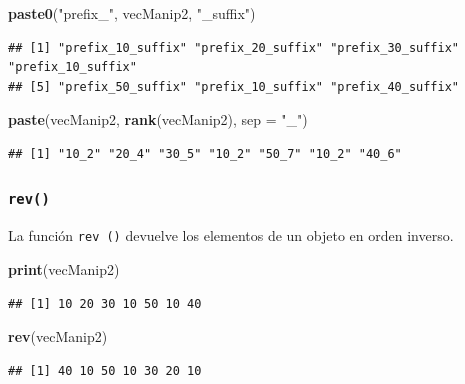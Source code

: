 \documentclass[
]{book}
\newenvironment{Shaded}{\begin{snugshade}}{\end{snugshade}}
\newcommand{\DataTypeTok}[1]{\textcolor[rgb]{0.13,0.29,0.53}{#1}}
\newcommand{\KeywordTok}[1]{\textcolor[rgb]{0.13,0.29,0.53}{\textbf{#1}}}
\newcommand{\NormalTok}[1]{#1}
\newcommand{\StringTok}[1]{\textcolor[rgb]{0.31,0.60,0.02}{#1}}
\begin{document}
\begin{Shaded}
\begin{Highlighting}[]
\KeywordTok{paste0}\NormalTok{(}\StringTok{"prefix_"}\NormalTok{, vecManip2, }\StringTok{"_suffix"}\NormalTok{)}
\end{Highlighting}
\end{Shaded}

\begin{verbatim}
## [1] "prefix_10_suffix" "prefix_20_suffix" "prefix_30_suffix" "prefix_10_suffix"
## [5] "prefix_50_suffix" "prefix_10_suffix" "prefix_40_suffix"
\end{verbatim}

\begin{Shaded}
\begin{Highlighting}[]
\KeywordTok{paste}\NormalTok{(vecManip2, }\KeywordTok{rank}\NormalTok{(vecManip2), }\DataTypeTok{sep =} \StringTok{"_"}\NormalTok{)}
\end{Highlighting}
\end{Shaded}

\begin{verbatim}
## [1] "10_2" "20_4" "30_5" "10_2" "50_7" "10_2" "40_6"
\end{verbatim}

\hypertarget{l015rev}{%
\subsubsection{\texorpdfstring{\texttt{rev()}}{rev()}}\label{l015rev}}

La función \texttt{rev\ ()} devuelve los elementos de un objeto en orden inverso.

\begin{Shaded}
\begin{Highlighting}[]
\KeywordTok{print}\NormalTok{(vecManip2)}
\end{Highlighting}
\end{Shaded}

\begin{verbatim}
## [1] 10 20 30 10 50 10 40
\end{verbatim}

\begin{Shaded}
\begin{Highlighting}[]
\KeywordTok{rev}\NormalTok{(vecManip2)}
\end{Highlighting}
\end{Shaded}

\begin{verbatim}
## [1] 40 10 50 10 30 20 10
\end{verbatim}
\end{document}
